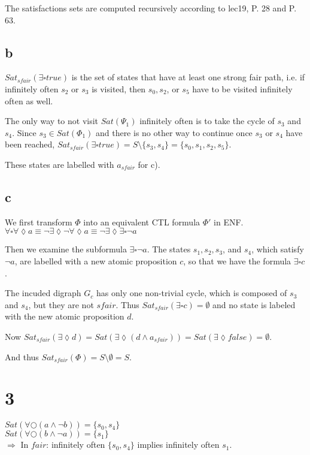 \documentclass[11pt]{article}
\begin{document}
The satisfactions sets are computed recursively according to lec19, P. 28 and P. 63.

\subsection{b}

$Sat_{sfair}(\exists \square true)$ is the set of states that have at least one strong fair path, i.e. if infinitely often $s_2$ or $s_3$ is visited, then $s_0, s_2$, or $s_5$ have to be visited infinitely often as well.

The only way to not visit $Sat(\Psi_1)$ infinitely often is to take the cycle of $s_3$ and $s_4$.
Since $s_3 \in Sat(\Phi_1)$ and there is no other way to continue once $s_3$ or $s_4$ have been reached, $Sat_{sfair}(\exists \square true) = S \setminus \{s_3, s_4\} = \{s_0, s_1, s_2, s_5\}$.

These states are labelled with $a_{sfair}$ for c).

\subsection{c}

We first transform $\Phi$ into an equivalent CTL formula $\Phi'$ in ENF.\\
$\forall \square \forall \lozenge a
\equiv \lnot \exists \lozenge \lnot \forall \lozenge a
\equiv \lnot \exists \lozenge \exists \square \lnot a$

Then we examine the subformula $\exists \square \lnot a$.
The states $s_1, s_2, s_3$, and $s_4$, which satisfy $\lnot a$, are labelled with a new atomic proposition $c$, so that we have the formula $\exists \square c$.

The incuded digraph $G_c$ has only one non-trivial cycle, which is composed of $s_3$ and $s_4$, but they are not $sfair$.
Thus $Sat_{sfair}(\exists \square c) = \emptyset$ and no state is labeled with the new atomic proposition $d$.

Now $Sat_{sfair}(\exists \lozenge d) = Sat(\exists \lozenge (d \land a_{sfair})) = Sat(\exists \lozenge false) = \emptyset$.

And thus $Sat_{sfair}(\Phi) = S \setminus \emptyset = S$.


\section{3}

$Sat(\forall \bigcirc (a \land \lnot b)) = \{s_0, s_4\}$\\
$Sat(\forall \bigcirc (b \land \lnot a)) = \{s_1\}$\\
$\Rightarrow$ In $fair$: infinitely often $\{s_0, s_4\}$ implies infinitely often $s_1$.\\
\end{document}
